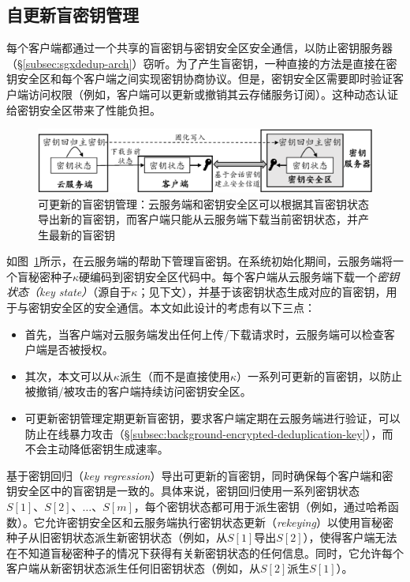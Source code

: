 \subsection{自更新盲密钥管理}
\label{subsec:sgxdedup-key-management}

每个客户端都通过一个共享的盲密钥与密钥安全区安全通信，以防止密钥服务器 （\S\ref{subsec:sgxdedup-arch}）窃听。为了产生盲密钥，一种直接的方法是直接在密钥安全区和每个客户端之间实现密钥协商协议。但是，密钥安全区需要即时验证客户端访问权限（例如，客户端可以更新或撤销其云存储服务订阅）。这种动态认证给密钥安全区带来了性能负担。

\begin{figure}[!htb]
\centering
\includegraphics[width=\textwidth]{pic/sgxdedup/keyRegression.pdf}
\caption{可更新的盲密钥管理：云服务端和密钥安全区可以根据其盲密钥状态导出新的盲密钥，而客户端只能从云服务端下载当前密钥状态，并产生最新的盲密钥}
\label{fig:sgxdedup-keymanage}
\end{figure}

如图~\ref{fig:sgxdedup-keymanage}所示，\sysnameS 在云服务端的帮助下管理盲密钥。在系统初始化期间，云服务端将一个盲秘密种子$\kappa$硬编码到密钥安全区代码中。每个客户端从云服务端下载一个\textit{密钥状态（key state）}（源自于$\kappa$；见下文），并基于该密钥状态生成对应的盲密钥，用于与密钥安全区的安全通信。本文如此设计的考虑有以下三点：
\begin{itemize}
    \item 首先，当客户端对云服务端发出任何上传/下载请求时，云服务端可以检查客户端是否被授权。
    \item 其次，本文可以从$\kappa$派生（而不是直接使用$\kappa$）一系列可更新的盲密钥，以防止被撤销/被攻击的客户端持续访问密钥安全区。
    \item 可更新密钥管理定期更新盲密钥，要求客户端定期在云服务端进行验证，可以防止在线暴力攻击（\S\ref{subsec:background-encrypted-deduplication-key}），而不会主动降低密钥生成速率\cite{bellare2013DupLESS}。
\end{itemize}

\sysnameS 基于密钥回归（\textit{key regression}）\cite{fu06}导出可更新的盲密钥，同时确保每个客户端和密钥安全区中的盲密钥是一致的。具体来说，密钥回归使用一系列密钥状态$S[1]、S[2]、\ldots、S[m]$，每个密钥状态都可用于派生密钥（例如，通过哈希函数）。它允许密钥安全区和云服务端执行密钥状态更新（\textit{rekeying}）以使用盲秘密种子从旧密钥状态派生新密钥状态（例如，从$S[1]$导出$S[2]$），使得客户端无法在不知道盲秘密种子的情况下获得有关新密钥状态的任何信息。同时，它允许每个客户端从新密钥状态派生任何旧密钥状态（例如，从$S[2]$派生$S[1]$）。


